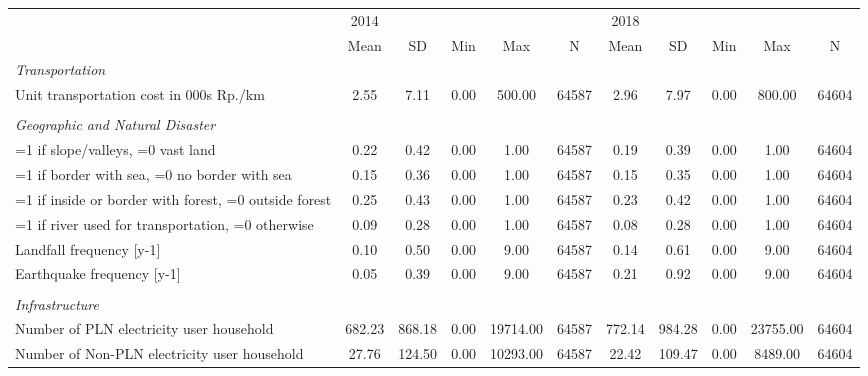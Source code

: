 \begin{tabular}{l*{2}{ccccc}}
\toprule
                &     2014&         &         &         &         &     2018&         &         &         &         \\
                &     Mean&       SD&      Min&      Max&        N&     Mean&       SD&      Min&      Max&        N\\
\midrule
\emph{Transportation}&         &         &         &         &         &         &         &         &         &         \\
Unit transportation cost in 000s Rp./km&     2.55&     7.11&     0.00&   500.00&    64587&     2.96&     7.97&     0.00&   800.00&    64604\\
\vspace{0.1em} \\ \emph{Geographic and Natural Disaster}&         &         &         &         &         &         &         &         &         &         \\
=1 if slope/valleys, =0 vast land&     0.22&     0.42&     0.00&     1.00&    64587&     0.19&     0.39&     0.00&     1.00&    64604\\
=1 if border with sea, =0 no border with sea&     0.15&     0.36&     0.00&     1.00&    64587&     0.15&     0.35&     0.00&     1.00&    64604\\
=1 if inside or border with forest, =0 outside forest&     0.25&     0.43&     0.00&     1.00&    64587&     0.23&     0.42&     0.00&     1.00&    64604\\
=1 if river used for transportation, =0 otherwise&     0.09&     0.28&     0.00&     1.00&    64587&     0.08&     0.28&     0.00&     1.00&    64604\\
Landfall frequency [y-1]&     0.10&     0.50&     0.00&     9.00&    64587&     0.14&     0.61&     0.00&     9.00&    64604\\
Earthquake frequency [y-1]&     0.05&     0.39&     0.00&     9.00&    64587&     0.21&     0.92&     0.00&     9.00&    64604\\
\vspace{0.1em} \\ \emph{Infrastructure}&         &         &         &         &         &         &         &         &         &         \\
Number of PLN electricity user household&   682.23&   868.18&     0.00& 19714.00&    64587&   772.14&   984.28&     0.00& 23755.00&    64604\\
Number of Non-PLN electricity user household&    27.76&   124.50&     0.00& 10293.00&    64587&    22.42&   109.47&     0.00&  8489.00&    64604\\

\end{tabular}

